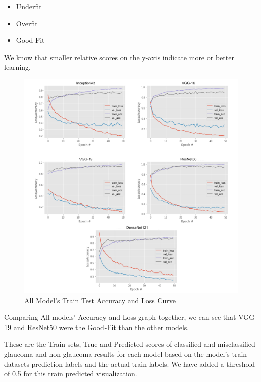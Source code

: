 \begin{itemize}
    \item Underfit
    \item Overfit
    \item Good Fit
\end{itemize}

\noindent We know that smaller relative scores on the y-axis indicate more or better learning. 

\vspace{5mm}
\begin{figure}[hbt!]
\centering
\includegraphics[scale=0.75]{images/fig-35.png}
\caption{All Model’s Train Test Accuracy and Loss Curve}
\label{fig:x All Model’s Train Test Accuracy and Loss Curve}
\end{figure}

\vspace{5mm}
\noindent Comparing All models' Accuracy and Loss graph together, we can see that VGG-19 and ResNet50 were the Good-Fit than the other models.

\vspace{5mm}
\noindent These are the Train sets, True and Predicted scores of classified and misclassified glaucoma and non-glaucoma results for each model based on the model’s train datasets prediction labels and the actual train labels. We have added a threshold of 0.5 for this train predicted visualization.

